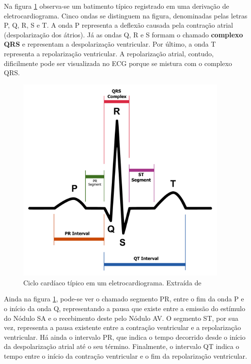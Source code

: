 Na figura \ref{fig:beat} observa-se um batimento típico registrado em uma derivação de eletrocardiograma. Cinco ondas se distinguem na figura, denominadas pelas letras P, Q, R, S e T. A onda P representa a deflexão causada pela contração atrial (despolarização dos átrios). Já as ondas Q, R e S formam o chamado \textbf{complexo QRS} e representam a despolarização ventricular. Por último, a onda T representa a repolarização ventricular. A repolarização atrial, contudo, dificilmente pode ser visualizada no ECG porque se mistura com o complexo QRS.

\begin{figure}[ht!]
 \centering
 \includegraphics[width=300pt]{figures/chap2-beat.pdf}
 \caption[Ciclo cardíaco típico em um eletrocardiograma]{Ciclo cardíaco típico em um eletrocardiograma. Extraída de \cite{Atkielski2007}}
 \label{fig:beat}
\end{figure}

Ainda na figura \ref{fig:beat}, pode-se ver o chamado segmento PR, entre o fim da onda P e o início da onda Q, representando a pausa que existe entre a emissão do estímulo do Nódulo SA e o recebimento deste pelo Nódulo AV. O segmento ST, por sua vez, representa a pausa existente entre a contração ventricular e a repolarização ventricular. Há ainda o intervalo PR, que indica o tempo decorrido desde o início da despolarização atrial até o seu término. Finalmente, o intervalo QT indica o tempo entre o início da contração ventricular e o fim da repolarização ventricular.

